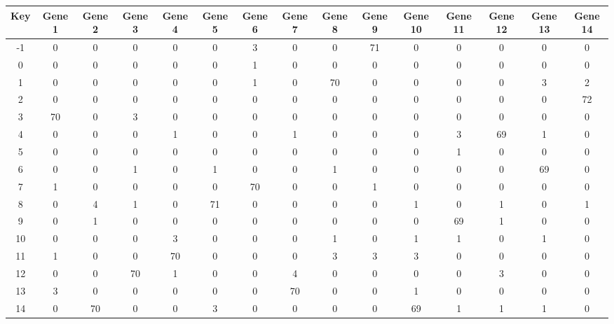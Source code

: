 \begin{tabular}{|c|c|c|c|c|c|c|c|c|c|c|c|c|c|c|}
\hline
Key & Gene 1 & Gene 2 & Gene 3 & Gene 4 & Gene 5 & Gene 6 & Gene 7 & Gene 8 & Gene 9 & Gene 10 & Gene 11 & Gene 12 & Gene 13 & Gene 14 \\
\hline
-1 & 0 & 0 & 0 & 0 & 0 & 3 & 0 & 0 & 71 & 0 & 0 & 0 & 0 & 0 \\
0 & 0 & 0 & 0 & 0 & 0 & 1 & 0 & 0 & 0 & 0 & 0 & 0 & 0 & 0 \\
1 & 0 & 0 & 0 & 0 & 0 & 1 & 0 & 70 & 0 & 0 & 0 & 0 & 3 & 2 \\
2 & 0 & 0 & 0 & 0 & 0 & 0 & 0 & 0 & 0 & 0 & 0 & 0 & 0 & 72 \\
3 & 70 & 0 & 3 & 0 & 0 & 0 & 0 & 0 & 0 & 0 & 0 & 0 & 0 & 0 \\
4 & 0 & 0 & 0 & 1 & 0 & 0 & 1 & 0 & 0 & 0 & 3 & 69 & 1 & 0 \\
5 & 0 & 0 & 0 & 0 & 0 & 0 & 0 & 0 & 0 & 0 & 1 & 0 & 0 & 0 \\
6 & 0 & 0 & 1 & 0 & 1 & 0 & 0 & 1 & 0 & 0 & 0 & 0 & 69 & 0 \\
7 & 1 & 0 & 0 & 0 & 0 & 70 & 0 & 0 & 1 & 0 & 0 & 0 & 0 & 0 \\
8 & 0 & 4 & 1 & 0 & 71 & 0 & 0 & 0 & 0 & 1 & 0 & 1 & 0 & 1 \\
9 & 0 & 1 & 0 & 0 & 0 & 0 & 0 & 0 & 0 & 0 & 69 & 1 & 0 & 0 \\
10 & 0 & 0 & 0 & 3 & 0 & 0 & 0 & 1 & 0 & 1 & 1 & 0 & 1 & 0 \\
11 & 1 & 0 & 0 & 70 & 0 & 0 & 0 & 3 & 3 & 3 & 0 & 0 & 0 & 0 \\
12 & 0 & 0 & 70 & 1 & 0 & 0 & 4 & 0 & 0 & 0 & 0 & 3 & 0 & 0 \\
13 & 3 & 0 & 0 & 0 & 0 & 0 & 70 & 0 & 0 & 1 & 0 & 0 & 0 & 0 \\
14 & 0 & 70 & 0 & 0 & 3 & 0 & 0 & 0 & 0 & 69 & 1 & 1 & 1 & 0 \\
\hline
\end{tabular}